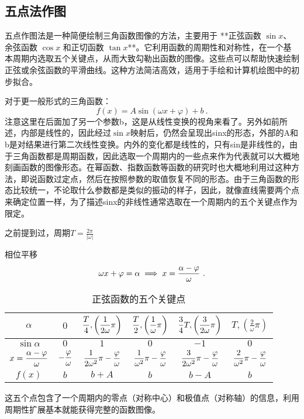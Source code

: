 \subsection{五点法作图}

五点作图法是一种简便绘制三角函数图像的方法，主要用于 **正弦函数 $\sin x$、余弦函数 $\cos x$ 和正切函数 $\tan x$**。它利用函数的周期性和对称性，在一个基本周期内选取五个关键点，从而大致勾勒出函数的图像。这些点可以帮助快速绘制正弦或余弦函数的平滑曲线。这种方法简洁高效，适用于手绘和计算机绘图中的初步拟合。

对于更一般形式的三角函数：
\begin{equation}
f(x) = A \sin(\omega x + \varphi) + b~.
\end{equation}
注意这里在后面加了另一个参数b，这是从线性变换的视角来看了。另外如前所述，内部是线性的，因此经过$\sin x$映射后，仍然会呈现出sinx的形态，外部的A和b是对结果进行第二次线性变换。内外的变化都是线性的，只有sin是非线性的，由于三角函数都是周期函数，因此选取一个周期内的一些点来作为代表就可以大概地刻画函数的图像形态。在幂函数、指数函数等函数的研究时也大概地利用过这种方法，即说函数过定点，然后在按照参数的取值恢复不同的形态。由于三角函数的形态比较统一，不论取什么参数都是类似的振动的样子，因此，就像直线需要两个点来确定位置一样，为了描述sinx的非线性通常选取在一个周期内的五个关键点作为限定。

之前提到过，周期$\displaystyle T = \frac{2\pi}{|\omega|}$

相位平移
\begin{equation}
\omega x + \varphi=\alpha\implies x={\alpha-\varphi\over \omega}~.
\end{equation}

\begin{table}[ht]
\centering
\caption{正弦函数的五个关键点}\label{tab_HsSinF1}
\begin{tabular}{|c|c|c|c|c|c|}
\hline
$\alpha$ & $0$ &$\displaystyle {T\over4},\left(\frac{1}{2\omega}\pi\right)$& $\displaystyle {T\over2},\left(\frac{1}{\omega}\pi\right)$ & $\displaystyle {3\over4}T,\left(\frac{3}{2\omega}\pi\right)$ & $\displaystyle T,\left(\frac{2}{\omega}\pi\right)$\\
\hline
$\sin \alpha$ & $0$&$1$&$0$&$-1$&$0$ \\
\hline
$x=\displaystyle{\alpha-\varphi\over \omega}$&$\displaystyle-{\varphi\over \omega}$&$\displaystyle{1\over 2\omega^2}\pi-{\varphi\over \omega}$&$\displaystyle{1\over \omega^2}\pi-{\varphi\over \omega}$&$\displaystyle{3\over 2\omega^2}\pi-{\varphi\over \omega}$&$\displaystyle{2\over \omega^2}\pi-{\varphi\over \omega}$\\
\hline
$f(x)$ & $b$&$b+A$&$b$&$b-A$&$b$ \\
\hline
\end{tabular}
\end{table}
这五个点包含了一个周期内的零点（对称中心）和极值点（对称轴）的信息，利用周期性扩展基本就能获得完整的函数图像。

